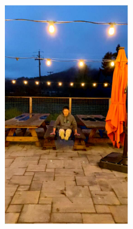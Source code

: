 \documentclass[letterpaper,12pt]{article}
\begin{document}
\begin{figure}[htbp]
\begin{subfigure}{0.128\textwidth}
			\includegraphics[width=\linewidth]{LoLi-Phone-imgT_1/MBLLEN}
			\captionsetup{font=scriptsize}
			\caption{}
			\label{fig: LoLi-Phone-imgT_1_e}
		\end{subfigure}
		\begin{subfigure}{0.128\textwidth}

\end{subfigure}
\end{figure}
\end{document}
